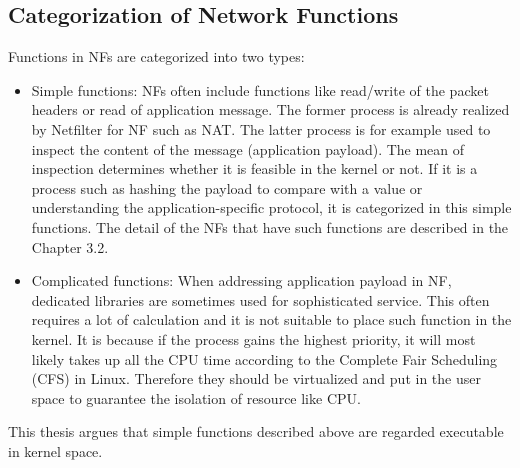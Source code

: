  \subsection{Categorization of Network Functions}
 Functions in NFs are categorized into two types:
 \begin{itemize}
 	\item Simple functions: NFs often include functions like read/write of the packet headers or read of application message. The former process is already realized by Netfilter for NF such as NAT. The latter process is for example used to inspect the content of the message (application payload). The mean of inspection determines whether it is feasible in the kernel or not. If it is a  process such as hashing the payload to compare with a value or understanding the application-specific protocol, it is categorized in this simple functions. The detail of the NFs that have such functions are described in the Chapter 3.2. 
 	\item Complicated functions: When addressing application payload in NF, dedicated libraries are sometimes used for sophisticated service. This often requires a lot of calculation and it is not suitable to place such function in the kernel. It is because if the process gains the highest priority, it will most likely takes up all the CPU time according to the Complete Fair Scheduling (CFS) in Linux. Therefore they should be virtualized and put in the user space to guarantee the isolation of resource like CPU. 
 \end{itemize}
 This thesis argues that simple functions described above are regarded executable in kernel space.

